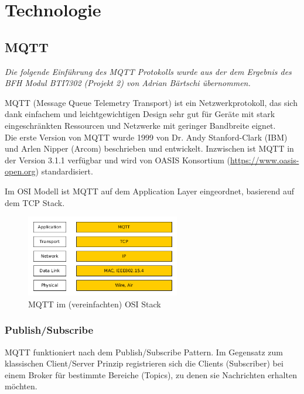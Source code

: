 \chapter{Technologie}
\label{chap:technologie}

\section{MQTT}

\textit{Die folgende Einführung des MQTT Protokolls wurde aus der dem Ergebnis des BFH Modul BTI7302 (Projekt 2) von Adrian Bärtschi übernommen.}

MQTT (Message Queue Telemetry Transport) ist ein Netzwerkprotokoll, das sich dank einfachem und leichtgewichtigen Design sehr gut für Geräte mit stark eingeschränkten Ressourcen und Netzwerke mit geringer Bandbreite eignet. 
\\
Die erste Version von MQTT wurde 1999 von Dr. Andy Stanford-Clark (IBM) und Arlen Nipper (Arcom) beschrieben und entwickelt. Inzwischen ist MQTT in der Version 3.1.1 verfügbar  \cite{mqttSpez} und wird von OASIS Konsortium (\url{https://www.oasis-open.org}) standardisiert.

Im OSI Modell ist MQTT auf dem Application Layer eingeordnet, basierend auf dem TCP Stack.

\begin{figure}[H]
	\centering
		\includegraphics[width=0.6\textwidth]{diag/osi_mqtt.png}
	\caption{\label{fig:mqttosi}MQTT im (vereinfachten) OSI Stack}
\end{figure}

\subsection{Publish/Subscribe}
MQTT funktioniert nach dem Publish/Subscribe Pattern. Im Gegensatz zum klassischen Client/Server Prinzip registrieren sich die Clients (Subscriber) bei einem Broker für bestimmte Bereiche (Topics), zu denen sie Nachrichten erhalten möchten.
\\ \\

